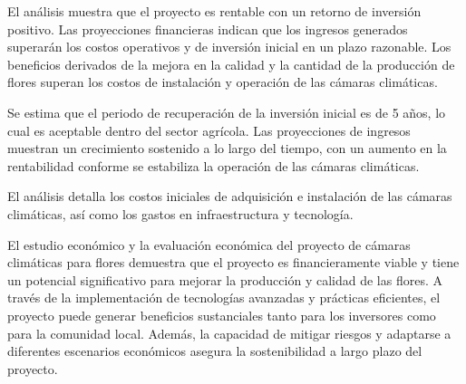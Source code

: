  El análisis muestra que el proyecto es rentable con un retorno de inversión positivo. Las proyecciones financieras indican que los ingresos generados superarán los costos operativos y de inversión inicial en un plazo razonable.
 Los beneficios derivados de la mejora en la calidad y la cantidad de la producción de flores superan los costos de instalación y operación de las cámaras climáticas.

Se estima que el periodo de recuperación de la inversión inicial es de 5 años, lo cual es aceptable dentro del sector agrícola.
Las proyecciones de ingresos muestran un crecimiento sostenido a lo largo del tiempo, con un aumento en la rentabilidad conforme se estabiliza la operación de las cámaras climáticas.

El análisis detalla los costos iniciales de adquisición e instalación de las cámaras climáticas, así como los gastos en infraestructura y tecnología.

El estudio económico y la evaluación económica del proyecto de cámaras climáticas para flores demuestra que el proyecto es financieramente viable y tiene un potencial significativo para mejorar la producción y calidad de las flores. A través de la implementación de tecnologías avanzadas y prácticas eficientes, el proyecto puede generar beneficios sustanciales tanto para los inversores como para la comunidad local. Además, la capacidad de mitigar riesgos y adaptarse a diferentes escenarios económicos asegura la sostenibilidad a largo plazo del proyecto.